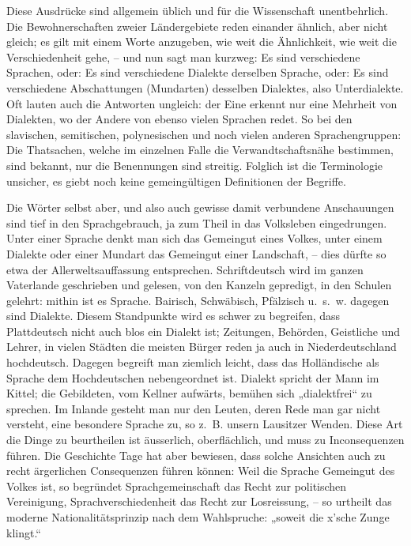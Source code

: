 Diese Ausdrücke sind allgemein üblich und für die Wissenschaft unentbehrlich. Die Bewohnerschaften zweier Ländergebiete reden einander ähnlich, aber nicht gleich; es gilt mit einem Worte anzugeben, wie weit die Ähnlichkeit, wie weit die Verschiedenheit gehe, – und nun sagt man kurzweg: Es sind verschiedene Sprachen, oder: Es sind verschiedene Dialekte derselben Sprache, oder: Es sind verschiedene Abschattungen (Mundarten) desselben Dialektes, also Unterdialekte. Oft lauten auch die Antworten ungleich: der Eine erkennt nur eine Mehrheit von Dialekten, wo der Andere von ebenso vielen Sprachen redet. So bei den slavischen, \label{fp.55} semitischen, polynesischen und noch vielen anderen Sprachengruppen: Die Thatsachen, welche im einzelnen Falle die Verwandtschaftsnähe bestimmen, sind bekannt, nur die Benennungen sind streitig. Folglich ist die Terminologie unsicher, es giebt noch keine gemeingültigen Definitionen der Begriffe.

\label{sp.55}

Die Wörter selbst aber, und also auch gewisse damit verbundene Anschau\-ungen sind tief in den Sprachgebrauch, ja zum Theil in das Volksleben eingedrungen. Unter einer Sprache denkt man sich das Gemeingut eines Volkes, unter einem Dialekte oder einer Mundart das Gemeingut einer Landschaft, – dies dürfte so etwa der Allerweltsauffassung entsprechen. Schriftdeutsch wird im ganzen Vaterlande geschrieben und gelesen, von den Kanzeln gepredigt, in den Schulen gelehrt: mithin ist es Sprache. Bairisch, Schwäbisch, Pfälzisch u.~s.~w. dagegen sind Dialekte. Diesem Standpunkte wird es schwer zu begreifen, dass Plattdeutsch nicht auch blos ein Dialekt ist; Zeitungen, Behörden, Geistliche und Lehrer, in vielen Städten die meisten Bürger reden ja auch in Niederdeutschland hochdeutsch. Dagegen begreift man ziemlich leicht, dass das Holländische als Sprache dem Hochdeutschen nebengeordnet ist. Dialekt spricht der Mann im Kittel; die Gebildeten, vom Kellner aufwärts, bemühen sich „dialektfrei“ zu sprechen. Im Inlande gesteht man nur den Leuten, deren Rede man gar nicht versteht, eine besondere Sprache zu, so z.~B. unsern Lausitzer Wenden. Diese Art die Dinge zu beurtheilen ist äusserlich, oberflächlich, und muss zu Inconsequenzen führen. Die Geschichte  Tage hat aber bewiesen, dass solche Ansichten auch zu recht ärgerlichen Consequenzen führen können: Weil die Sprache Gemeingut des Volkes ist, so begründet Sprachgemeinschaft das Recht zur politischen Vereinigung, Sprachverschiedenheit das Recht zur Losreissung, – so urtheilt das moderne Nationalitätsprinzip nach dem Wahlspruche: „soweit die x’sche Zunge klingt.“

